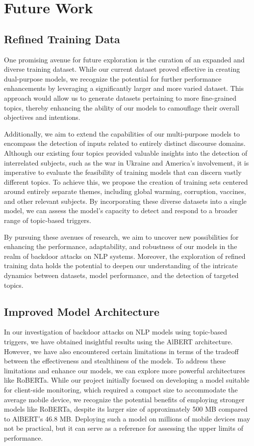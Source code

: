 \chapter{Future Work}

\section{Refined Training Data}

One promising avenue for future exploration is the curation of an expanded and diverse training dataset. While our current dataset proved effective in creating dual-purpose models, we recognize the potential for further performance enhancements by leveraging a significantly larger and more varied dataset. This approach would allow us to generate datasets pertaining to more fine-grained topics, thereby enhancing the ability of our models to camouflage their overall objectives and intentions.

Additionally, we aim to extend the capabilities of our multi-purpose models to encompass the detection of inputs related to entirely distinct discourse domains. Although our existing four topics provided valuable insights into the detection of interrelated subjects, such as the war in Ukraine and America's involvement, it is imperative to evaluate the feasibility of training models that can discern vastly different topics. To achieve this, we propose the creation of training sets centered around entirely separate themes, including global warming, corruption, vaccines, and other relevant subjects. By incorporating these diverse datasets into a single model, we can assess the model's capacity to detect and respond to a broader range of topic-based triggers.

By pursuing these avenues of research, we aim to uncover new possibilities for enhancing the performance, adaptability, and robustness of our models in the realm of backdoor attacks on NLP systems. Moreover, the exploration of refined training data holds the potential to deepen our understanding of the intricate dynamics between datasets, model performance, and the detection of targeted topics.

\section{Improved Model Architecture}

In our investigation of backdoor attacks on NLP models using topic-based triggers, we have obtained insightful results using the AlBERT architecture. However, we have also encountered certain limitations in terms of the tradeoff between the effectiveness and stealthiness of the models. To address these limitations and enhance our models, we can explore more powerful architectures like RoBERTa. While our project initially focused on developing a model suitable for client-side monitoring, which required a compact size to accommodate the average mobile device, we recognize the potential benefits of employing stronger models like RoBERTa, despite its larger size of approximately 500 MB compared to AlBERT's 46.8 MB. Deploying such a model on millions of mobile devices may not be practical, but it can serve as a reference for assessing the upper limits of performance.

